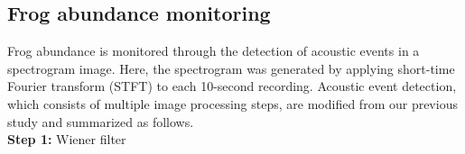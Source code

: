 \begin{table}[htb!]
\centering
\caption[Acoustic parameters of eight frog species averaged for ten randomly selected syllables]{Dominant frequency ($F_{0}$) and syllable duration ($T_{s}$) of eight frog species averaged for ten randomly selected syllables.}
\label{tab:Ch7_parameters}
\end{table}

\subsection{Frog abundance monitoring}
Frog abundance is monitored through the detection of acoustic events in a spectrogram image. Here, the spectrogram was generated by applying short-time Fourier transform (STFT) to each 10-second recording. Acoustic event detection, which consists of multiple image processing steps, are modified from our previous study \citep{emr2015Xie} and summarized as follows.
\\
\textbf{Step 1:} Wiener filter 

